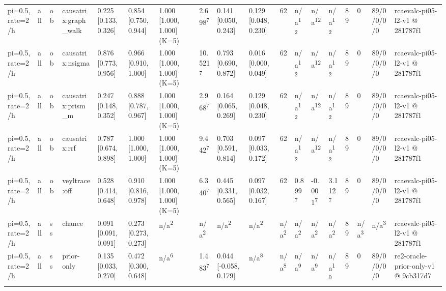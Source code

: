 \begin{table}[t]
\begin{tabular}{llllllllllllllllll}
pi=0.5, rate=2/h & all & ob & causatrix:graph\_walk & 0.225 [0.133, 0.326] & 0.854 [0.750, 0.944] & 1.000 [1.000, 1.000] (K=5) & 2.698\textsuperscript{7} & 0.141 [0.050, 0.243] & 0.129 [0.048, 0.230] & 62 & n/a\textsuperscript{12} & n/a\textsuperscript{12} & n/a\textsuperscript{12} & 89 & 0 & 89/0/0/0/0 & rcaevalc-pi05-l2-v1 @ 281787f1 \\
pi=0.5, rate=2/h & all & ob & causatrix:nsigma & 0.876 [0.773, 0.956] & 0.966 [0.910, 1.000] & 1.000 [1.000, 1.000] (K=5) & 10.521\textsuperscript{7} & 0.793 [0.690, 0.872] & 0.016 [0.000, 0.049] & 62 & n/a\textsuperscript{12} & n/a\textsuperscript{12} & n/a\textsuperscript{12} & 89 & 0 & 89/0/0/0/0 & rcaevalc-pi05-l2-v1 @ 281787f1 \\
pi=0.5, rate=2/h & all & ob & causatrix:prism\_m & 0.247 [0.148, 0.352] & 0.888 [0.787, 0.967] & 1.000 [1.000, 1.000] (K=5) & 2.968\textsuperscript{7} & 0.164 [0.065, 0.269] & 0.129 [0.048, 0.230] & 62 & n/a\textsuperscript{12} & n/a\textsuperscript{12} & n/a\textsuperscript{12} & 89 & 0 & 89/0/0/0/0 & rcaevalc-pi05-l2-v1 @ 281787f1 \\
pi=0.5, rate=2/h & all & ob & causatrix:rrf & 0.787 [0.674, 0.898] & 1.000 [1.000, 1.000] & 1.000 [1.000, 1.000] (K=5) & 9.442\textsuperscript{7} & 0.703 [0.591, 0.814] & 0.097 [0.033, 0.172] & 62 & n/a\textsuperscript{12} & n/a\textsuperscript{12} & n/a\textsuperscript{12} & 89 & 0 & 89/0/0/0/0 & rcaevalc-pi05-l2-v1 @ 281787f1 \\
pi=0.5, rate=2/h & all & ob & veyltrace:off & 0.528 [0.414, 0.648] & 0.910 [0.816, 0.978] & 1.000 [1.000, 1.000] (K=5) & 6.340\textsuperscript{7} & 0.445 [0.331, 0.565] & 0.097 [0.032, 0.167] & 62 & 0.899\textsuperscript{7} & -0.001\textsuperscript{7} & 3.112\textsuperscript{7} & 89 & 0 & 89/0/0/0/0 & rcaevalc-pi05-l2-v1 @ 281787f1 \\
pi=0.5, rate=2/h & all & ss & chance & 0.091 [0.091, 0.091] & 0.273 [0.273, 0.273] & n/a\textsuperscript{2} & n/a\textsuperscript{2} & n/a\textsuperscript{2} & n/a\textsuperscript{2} & n/a\textsuperscript{2} & n/a\textsuperscript{2} & n/a\textsuperscript{2} & n/a\textsuperscript{2} & 89 & n/a\textsuperscript{3} & n/a\textsuperscript{3} & rcaevalc-pi05-l2-v1 @ 281787f1 \\
pi=0.5, rate=2/h & all & ss & prior-only & 0.135 [0.033, 0.270] & 0.472 [0.300, 0.648] & n/a\textsuperscript{6} & 1.483\textsuperscript{7} & 0.044 [-0.058, 0.179] & n/a\textsuperscript{8} & n/a\textsuperscript{8} & n/a\textsuperscript{9} & n/a\textsuperscript{9} & n/a\textsuperscript{10} & 89 & 0 & 89/0/0/0/0 & re2-oracle-prior-only-v1 @ 9cb317d7 \\

\end{tabular}
\end{table}
